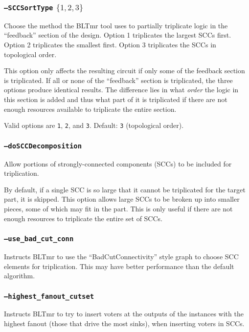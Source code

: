 \documentclass[english]{article}
\begin{document}
\subsubsection{\texttt{--SCCSortType} $\{1,2,3\}$}
Choose the method the BLTmr tool uses to partially triplicate logic in the 
``feedback'' section of the design.  Option 1 triplicates the largest SCCs 
first. Option 2 triplicates the smallest first. Option 3 triplicates the SCCs 
in topological order.

This option only affects the resulting circuit if only some of the feedback 
section is triplicated. If all or none of the ``feedback'' section is 
triplicated, the three options produce identical results. The difference lies 
in what \emph{order} the logic in this section is added and thus what part of 
it is triplicated if there are not enough resources available to triplicate the 
entire section.

Valid options are \texttt{1}, \texttt{2}, and \texttt{3}. Default: \texttt{3}
(topological order).

\subsubsection{\texttt{--doSCCDecomposition}}
Allow portions of strongly-connected components (SCCs) to be included for 
triplication. 

By default, if a single SCC is so large that it cannot be triplicated for the 
target part, it is skipped. This option allows large SCCs to be broken up into 
smaller pieces, some of which may fit in the part. This is only useful if there 
are not enough resources to triplicate the entire set of SCCs.


\subsubsection{\texttt{--use\_bad\_cut\_conn}}
Instructs BLTmr to use the ``BadCutConnectivity'' style graph to choose
SCC elements for triplication. This may have better performance than the 
default algorithm.

\subsubsection{\texttt{--highest\_fanout\_cutset}}
Instructs BLTmr to try to insert voters at the outputs of the instances with 
the highest fanout (those that drive the most sinks), when inserting voters 
in SCCs.
\end{document}
